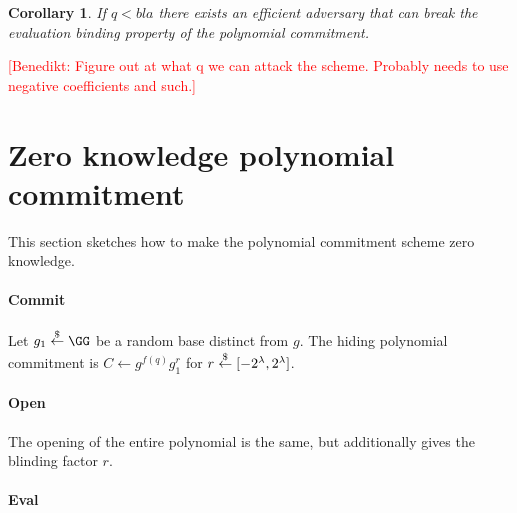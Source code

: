 \documentclass{article}
\newtheorem{corollary}{Corollary}
\newcommand{\benedikt}[1]{{\textcolor{red}{[Benedikt: #1]}}}
\newcommand{\benedikt}[1]{}
\begin{document}
\begin{corollary}
	If $q<bla$ there exists an efficient adversary that can break the evaluation binding property of the polynomial commitment.
\end{corollary}
\benedikt{Figure out at what q we can attack the scheme. Probably needs to use negative coefficients and such.}

  

\section{Zero knowledge polynomial commitment} 
This section sketches how to make the polynomial commitment scheme zero knowledge. 

\paragraph{Commit} Let $g_1 \sample \GG$ be a random base distinct from $g$. 
The hiding polynomial commitment is $C \leftarrow g^{f(q)}g_1^r$ for $r \overset{\$}{\gets} [-2^\lambda, 2^\lambda]$. 

\paragraph{Open} The opening of the entire polynomial is the same, but additionally gives the blinding factor $r$. 

\paragraph{Eval}
\end{document}
